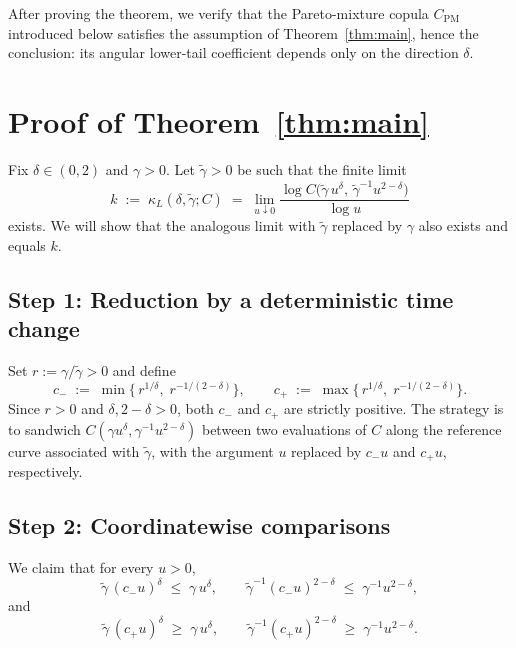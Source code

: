\documentclass[11pt]{article}
\theoremstyle{definition}
\newcommand{\PM}{\mathrm{PM}}
\begin{document}
After proving the theorem, we verify that the Pareto-mixture copula
$C_{\PM}$ introduced below satisfies the assumption of
Theorem~\ref{thm:main}, hence the conclusion: its angular lower-tail
coefficient depends only on the direction $\delta$.

\section{Proof of Theorem~\ref{thm:main}}

Fix $\delta\in(0,2)$ and $\gamma>0$. Let $\tilde\gamma>0$ be such that
the finite limit
\[
k \;:=\; \kappa_L(\delta,\tilde\gamma;C)
\;=\;
\lim_{u\downarrow 0}
\frac{\log C\!\bigl(\tilde\gamma\,u^{\delta},\,\tilde\gamma^{-1}u^{2-\delta}\bigr)}{\log u}
\]
exists. We will show that the analogous limit with $\tilde\gamma$
replaced by $\gamma$ also exists and equals $k$.

\subsection*{Step 1: Reduction by a deterministic time change}

Set $r := \gamma/\tilde\gamma > 0$ and define
\begin{equation}\label{eq:c-pm}
c_- \;:=\; \min\!\bigl\{\,r^{1/\delta},\;r^{-1/(2-\delta)}\bigr\},
\qquad
c_+ \;:=\; \max\!\bigl\{\,r^{1/\delta},\;r^{-1/(2-\delta)}\bigr\}.
\end{equation}
Since $r>0$ and $\delta,2-\delta>0$, both $c_-$ and $c_+$ are strictly
positive. The strategy is to sandwich
$C(\gamma u^{\delta},\gamma^{-1}u^{2-\delta})$ between two evaluations
of $C$ along the reference curve associated with $\tilde\gamma$, with
the argument $u$ replaced by $c_- u$ and $c_+ u$, respectively.

\subsection*{Step 2: Coordinatewise comparisons}

We claim that for every $u>0$,
\begin{equation}\label{eq:left-coord}
\tilde\gamma\,(c_- u)^{\delta} \;\le\; \gamma\,u^{\delta},
\qquad
\tilde\gamma^{-1}(c_- u)^{2-\delta} \;\le\; \gamma^{-1}u^{2-\delta},
\end{equation}
and
\begin{equation}\label{eq:right-coord}
\tilde\gamma\,(c_+ u)^{\delta} \;\ge\; \gamma\,u^{\delta},
\qquad
\tilde\gamma^{-1}(c_+ u)^{2-\delta} \;\ge\; \gamma^{-1}u^{2-\delta}.
\end{equation}
\end{document}
